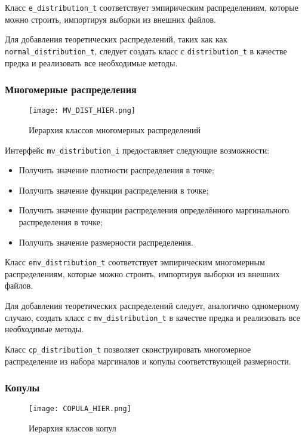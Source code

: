 Класс \texttt{e\_distribution\_t} соответствует эмпирическим распределениям, которые можно строить, импортируя выборки из внешних файлов.

Для добавления теоретических распределений, таких как как \texttt{normal\_distribution\_t}, следует создать класс с \texttt{distribution\_t} в качестве предка и реализовать все необходимые методы.

\subsubsection*{Многомерные распределения}

\begin{figure}[H]
	\centering
	\texttt{[image: MV\_DIST\_HIER.png]}
	\caption{Иерархия классов многомерных распределений}
\end{figure}

Интерфейс \texttt{mv\_distribution\_i} предоставляет следующие возможности:
\begin{itemize}
  \item Получить значение плотности распределения в точке;
  \item Получить значение функции распределения в точке;
  \item Получить значение функции распределения определённого маргинального распределения в точке;
  \item Получить значение размерности распределения.
\end{itemize}

Класс \texttt{emv\_distribution\_t} соответствует эмпирическим многомерным распределениям, которые можно строить, импортируя выборки из внешних файлов.

Для добавления теоретических распределений следует, аналогично одномерному случаю, создать класс с \texttt{mv\_distribution\_t} в качестве предка и реализовать все необходимые методы.

Класс \texttt{cp\_distribution\_t} позволяет сконструировать многомерное распределение из набора маргиналов и копулы соответствующей размерности.

\subsubsection*{Копулы}

\begin{figure}[H]
	\centering
	\texttt{[image: COPULA\_HIER.png]}
	\caption{Иерархия классов копул}
\end{figure}

